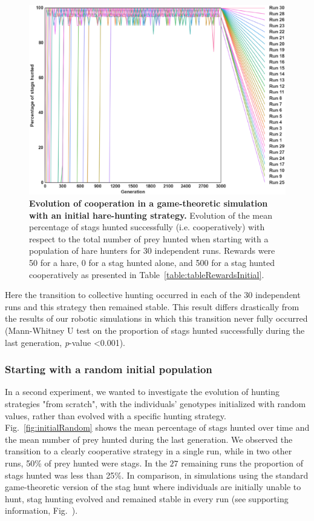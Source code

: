       \begin{figure}[hbtp]
        \centering
            \includegraphics[scale = 0.35]{fig/ArticleBio1/Fig4.eps}
        \caption{\textbf{Evolution of cooperation in a game-theoretic simulation with an initial hare-hunting strategy.} 
        Evolution of the mean percentage of stags hunted successfully (i.e. cooperatively) with respect to the total number of prey hunted when starting with a population of hare hunters for 30 independent runs. Rewards were 50 for a hare, 0 for a stag hunted alone, and 500 for a stag hunted cooperatively as presented in Table~\ref{table:tableRewardsInitial}.}
        \label{fig:hareHuntersTheo}
      \end{figure}

      Here the transition to collective hunting occurred in each of the 30 independent runs and this strategy then remained stable. This result differs drastically from the results of our robotic simulations in which this transition never fully occurred (Mann-Whitney U test on the proportion of stags hunted successfully during the last generation, {\em p}-value \textless 0.001).


    \subsubsection{Starting with a random initial population}
      In a second experiment, we wanted to investigate the evolution of hunting strategies "from scratch", with the individuals' genotypes initialized with random values, rather than evolved with a specific hunting strategy. Fig.~\ref{fig:initialRandom} shows the mean percentage of stags hunted over time and the mean number of prey hunted during the last generation. We observed the transition to a clearly cooperative strategy in a single run, while in two other runs, 50\% of prey hunted were stags. In the $27$ remaining runs the proportion of stags hunted was less than 25\%. In comparison, in simulations using the standard game-theoretic version of the stag hunt where individuals are initially unable to hunt, stag hunting evolved and remained stable in every run (see supporting information, Fig.~).


